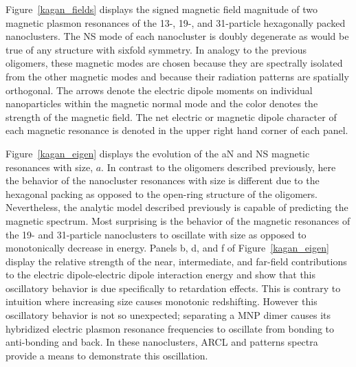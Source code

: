 \documentclass[journal=apchd5,manuscript=article]{achemso}
\begin{document}
Figure~\ref{kagan_fields} displays the signed magnetic field magnitude of two magnetic plasmon resonances of the 13-, 19-, and 31-particle hexagonally packed nanoclusters. The NS mode of each nanocluster is doubly degenerate as would be true of any structure with sixfold symmetry. In analogy to the previous oligomers, these magnetic modes are chosen because they are spectrally isolated from the other magnetic modes and because their radiation patterns are spatially orthogonal. The arrows denote the electric dipole moments on individual nanoparticles within the magnetic normal mode and the color denotes the strength of the magnetic field. The net electric or magnetic dipole character of each magnetic resonance is denoted in the upper right hand corner of each panel.

Figure~\ref{kagan_eigen} displays the evolution of the aN and NS magnetic resonances with size, $a$. In contrast to the oligomers described previously, here the behavior of the nanocluster resonances with size is different due to the hexagonal packing as opposed to the open-ring structure of the oligomers. Nevertheless, the analytic model described previously is capable of predicting the magnetic spectrum. Most surprising is the behavior of the magnetic resonances of the 19- and 31-particle nanoclusters to oscillate with size as opposed to monotonically decrease in energy. Panels b, d, and f of Figure~\ref{kagan_eigen} display the relative strength of the near, intermediate, and far-field contributions to the electric dipole-electric dipole interaction energy and show that this oscillatory behavior is due specifically to retardation effects. This is contrary to intuition where increasing size causes monotonic redshifting. However this oscillatory behavior is not so unexpected; separating a MNP dimer causes its hybridized electric plasmon resonance frequencies to oscillate from bonding to anti-bonding and back\cite{vonPlessen2007}. In these nanoclusters, ARCL and patterns spectra provide a means to demonstrate this oscillation.
\end{document}
